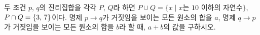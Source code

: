 두 조건 $p$, $q$의 진리집합을 각각 $P$, $Q$라 하면 $P\cup Q=\{x \mid x$는 $10$ 이하의 자연수$\}$, $P\cap Q=\{3,\mkern3mu 7\}$이다. 명제 $p\longrightarrow q$가 거짓임을 보이는 모든 원소의 합을 $a$, 명제 $q\longrightarrow p$가 거짓임을 보이는 모든 원소의 합을 $b$라 할 때, $a+b$의 값을 구하시오.
